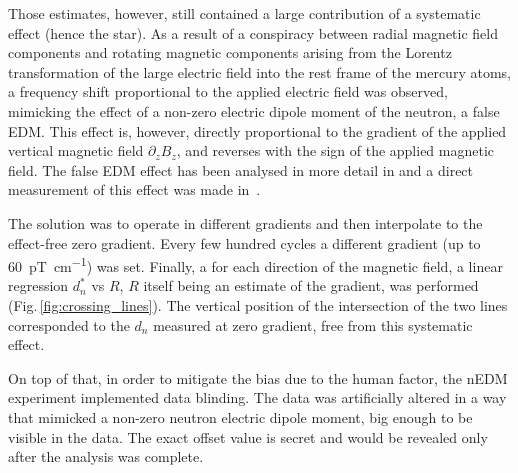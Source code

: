 Those estimates, however, still contained a large contribution of a systematic effect (hence the star). As a result of a conspiracy between radial magnetic field components and rotating magnetic components arising from the Lorentz transformation of the large electric field into the rest frame of the mercury atoms, a frequency shift proportional to the applied electric field was observed, mimicking the effect of a non-zero electric dipole moment of the neutron, a false EDM. This effect is, however, directly proportional to the gradient of the applied vertical magnetic field $\partial_z B_z$, and reverses with the sign of the applied magnetic field. The false EDM effect has been analysed in more detail in \cite{Pendlebury2004,PhysRevA.71.032104,PhysRevA.73.014101} and a direct measurement of this effect was made in~\cite{Afach2015falseEDM}.

The solution was to operate in different gradients and then interpolate to the effect-free zero gradient. Every few hundred cycles a different gradient (up to \SI{60}{\pico\tesla\per\centi\meter}) was set.
Finally, a for each direction of the magnetic field, a linear regression $d_n^*$ vs $R$, $R$ itself being an estimate of the gradient, was performed (Fig.\,\ref{fig:crossing_lines}). The vertical position of the intersection of the two lines corresponded to the $d_n$ measured at zero gradient, free from this systematic effect.


On top of that, in order to mitigate the bias due to the human factor, the nEDM experiment implemented data blinding. The data was artificially altered in a way that mimicked a non-zero neutron electric dipole moment, big enough to be visible in the data. The exact offset value is secret and would be revealed only after the analysis was complete.

